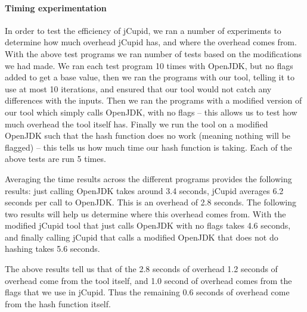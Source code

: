 \paragraph{Timing experimentation}
In order to test the efficiency of jCupid, we ran a number of experiments to
determine how much overhead jCupid has, and where the overhead comes from.
With the above test programs we ran number of tests based on the modifications
we had made. We ran each test program 10 times with OpenJDK, but no flags added
to get a base value, then we ran the programs with our tool, telling it to use
at most 10 iterations, and ensured that our tool would not catch any differences
with the inputs. Then we ran the programs with a modified version of our tool 
which simply calls OpenJDK, with no flags -- this allows us to test how much 
overhead the tool itself has. Finally we run the tool on a modified OpenJDK such
that the hash function does no work (meaning nothing will be flagged) -- this 
tells us how much time our hash function is taking. Each of the above tests are 
run 5 times.

Averaging the time results across the different programs provides the following
results: just calling OpenJDK takes around 3.4 seconds, jCupid averages 6.2 seconds
per call to OpenJDK. This is an overhead of 2.8 seconds. The following two results
will help us determine where this overhead comes from. With the modified jCupid tool
that just calls OpenJDK with no flags takes 4.6 seconds, and finally calling jCupid
that calls a modified OpenJDK that does not do hashing takes 5.6 seconds.

The above results tell us that of the 2.8 seconds of overhead 1.2 seconds of overhead
come from the tool itself, and 1.0 second of overhead comes from the flags that
we use in jCupid. Thus the remaining 0.6 seconds of overhead come from the hash
function itself.
